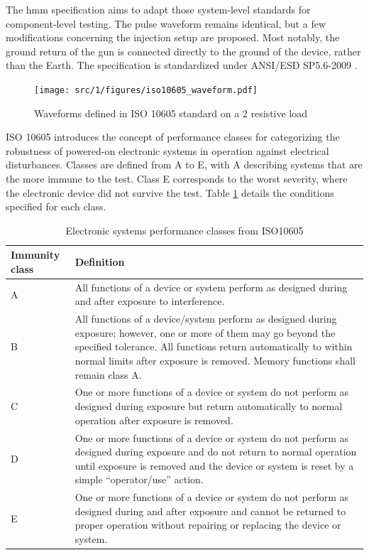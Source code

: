 The \gls{hmm} \cite{hmm} specification aims to adapt those system-level standards for component-level testing.
The pulse waveform remains identical, but a few modifications concerning the injection setup are proposed.
Most notably, the ground return of the gun is connected directly to the ground of the device, rather than the Earth.
The specification is standardized under ANSI/ESD SP5.6-2009 \cite{hmm}.

\begin{figure}[!h]
  \centering
  \texttt{[image: src/1/figures/iso10605\_waveform.pdf]}
  \caption{Waveforms defined in ISO 10605 standard on a 2\textOmega{} resistive load}
  \label{iso_pulse}
\end{figure}


ISO 10605 introduces the concept of performance classes for categorizing the robustness of powered-on electronic systems in operation against electrical disturbances.
Classes are defined from A to E, with A describing systems that are the more immune to the test.
Class E corresponds to the worst severity, where the electronic device did not survive the test.
Table \ref{tab:iso-class-a-levels} details the conditions specified for each class.

\begin{table}[!h]
\centering
\begin{tabular}{l|p{}}
Immunity class  & Definition   \\ \midrule
A  & All functions of a device or system perform as designed during and after exposure to interference.  \\ \midrule
B  & All functions of a device/system perform as designed during exposure; however, one or more of them may go beyond the specified tolerance. All functions return automatically to within normal limits after exposure is removed. Memory functions shall remain class A. \\ \midrule
C  & One or more functions of a device or system do not perform as designed during exposure but return automatically to normal operation after exposure is removed.   \\ \midrule
D  &  One or more functions of a device or system do not perform as designed during exposure and do not return to normal operation until exposure is removed and the device or system is reset by a simple “operator/use” action.   \\ \midrule
E   &  One or more functions of a device or system do not perform as designed during and after exposure and cannot be returned to proper operation without repairing or replacing the device or system.  \\
\bottomrule
\end{tabular}
\caption{Electronic systems performance classes from ISO10605}
\label{tab:iso-class-a-levels}
\end{table}

